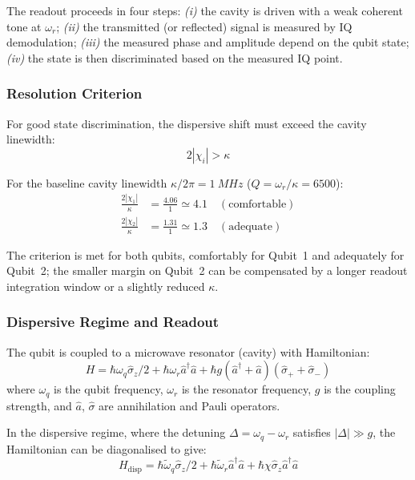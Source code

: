 The readout proceeds in four steps: \emph{(i)} the cavity is driven with a weak
coherent tone at $\omega_r$; \emph{(ii)} the transmitted (or reflected) signal is
measured by IQ demodulation; \emph{(iii)} the measured phase and amplitude depend
on the qubit state; \emph{(iv)} the state is then discriminated based on the
measured IQ point.

\subsubsection{Resolution Criterion}

For good state discrimination, the dispersive shift must exceed the cavity linewidth:
\begin{equation}
2|\chi_i| > \kappa
\end{equation}

For the baseline cavity linewidth $\kappa/2\pi = \SI{1}{MHz}$
($Q = \omega_r/\kappa = 6500$):
\begin{align}
\frac{2|\chi_1|}{\kappa} &= \frac{4.06}{1} \simeq 4.1 \quad (\text{comfortable}) \\
\frac{2|\chi_2|}{\kappa} &= \frac{1.31}{1} \simeq 1.3 \quad (\text{adequate})
\end{align}

The criterion is met for both qubits, comfortably for Qubit~1 and
adequately for Qubit~2; the smaller margin on Qubit~2 can be compensated
by a longer readout integration window or a slightly reduced $\kappa$.

\subsubsection{Dispersive Regime and Readout}

The qubit is coupled to a microwave resonator (cavity) with Hamiltonian:
\begin{equation}
H = \hbar\omega_q \hat{\sigma}_z/2 + \hbar\omega_r \hat{a}^\dagger\hat{a} + \hbar g(\hat{a}^\dagger + \hat{a})(\hat{\sigma}_+ + \hat{\sigma}_-)
\label{eq:jaynes_cummings}
\end{equation}
where $\omega_q$ is the qubit frequency, $\omega_r$ is the resonator frequency, $g$ is the coupling strength, and $\hat{a}$, $\hat{\sigma}$ are annihilation and Pauli operators.

In the dispersive regime, where the detuning $\Delta = \omega_q - \omega_r$ satisfies $|\Delta| \gg g$, the Hamiltonian can be diagonalised to give:
\begin{equation}
H_{\text{disp}} = \hbar\tilde{\omega}_q \hat{\sigma}_z/2 + \hbar\tilde{\omega}_r \hat{a}^\dagger\hat{a} + \hbar\chi \hat{\sigma}_z \hat{a}^\dagger\hat{a}
\end{equation}

